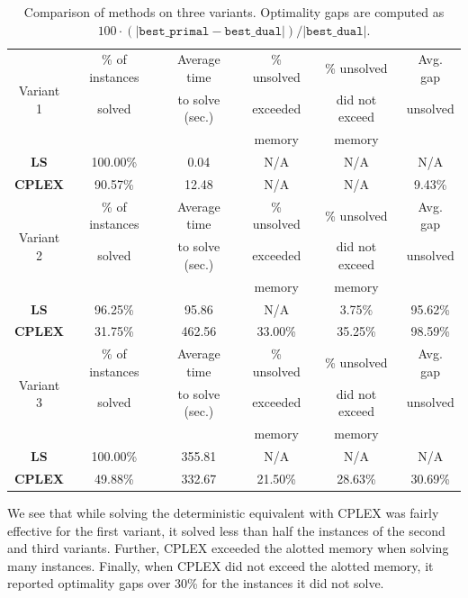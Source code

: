 \documentclass[12pt]{article}
\theoremstyle{thmstylethree}%
\begin{document}
\begin{table}[htp]
  \centering
  \caption{Comparison of methods on three variants. Optimality gaps are computed as $100\cdot (|\texttt{best\_primal}-\texttt{best\_dual}|)/|\texttt{best\_dual}|$. }
  \label{tbl:comp_bench}  
  \begin{tabular}{|c|c|c|c|c|c|}
    \toprule
    \multirow{3}{*}{Variant 1} & \% of instances  	& Average time  & \% unsolved 	& \% unsolved & Avg. gap  \\
                               &	solved		& to solve (sec.) &	exceeded	& did not exceed & unsolved \\
                               &				&			  & memory	& memory		   &			\\
    \midrule
    \textbf{LS} & 100.00\% &  0.04  & N/A & N/A & N/A \\
    \textbf{CPLEX} & 90.57\% &  12.48  & N/A & N/A & 9.43\% \\
    \midrule
    \multirow{3}{*}{Variant 2} & \% of instances  	& Average time  & \% unsolved 	& \% unsolved & Avg. gap  \\
                               &	solved		& to solve (sec.) &	exceeded	& did not exceed & unsolved \\
                               &				&			  & memory	& memory		   &			\\\midrule
    \textbf{LS} & 96.25\% 		&  95.86  		& N/A		& 3.75\%		   & 95.62\%  \\
    \textbf{CPLEX} & 31.75\% 	&  462.56  	& 33.00\%		& 35.25\%		   &	98.59\%  \\
    \midrule
    \multirow{3}{*}{Variant 3} & \% of instances  	& Average time  & \% unsolved 	& \% unsolved & Avg. gap  \\
                               &	solved		& to solve (sec.) &	exceeded	& did not exceed & unsolved \\
                               &				&			  & memory	& memory		   &			\\\midrule
    \textbf{LS} & 100.00\% 		&  355.81  	& N/A 		& N/A		   & N/A  \\
    \textbf{CPLEX} & 49.88\% 	&  332.67  	& 21.50\%		& 28.63\% 	   & 30.69\% \\
    \bottomrule
  \end{tabular}
\end{table}

We see that while solving the deterministic equivalent with CPLEX was fairly effective for the first variant, it solved less than half the instances of the second and third  variants. Further, CPLEX exceeded the alotted memory when solving many instances. Finally, when CPLEX did not exceed the alotted memory, it reported optimality gaps over 30\% for the instances it did not solve. 
\end{document}
